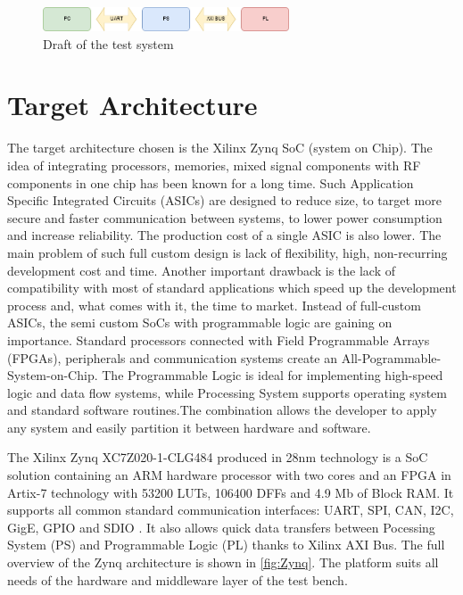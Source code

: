 \begin{figure}[H]
\centering
\includegraphics[width=0.65\textwidth]{figures/PCPSPL.png}
\caption{Draft of the test system}
\label{fig:draft}
\end{figure}

\section {Target Architecture}
The target architecture chosen is the Xilinx Zynq SoC (system on Chip). The idea of integrating processors, memories, mixed signal components with RF components in one chip has been known for a long time. Such Application Specific Integrated Circuits (ASICs) are designed to reduce size, to target more secure and faster communication between systems, to lower power consumption and increase reliability. The production cost of a single ASIC is also lower. The main problem of such full custom design is lack of flexibility, high, non-recurring development cost and time. Another important drawback is the lack of compatibility with most of standard applications which speed up the development process and, what comes with it, the time to market. Instead of full-custom ASICs, the semi custom SoCs with programmable logic are gaining on importance. Standard processors connected with Field Programmable Arrays (FPGAs), peripherals and communication systems create an All-Pogrammable-System-on-Chip. The Programmable Logic is ideal for implementing high-speed logic and data flow systems, while Processing System supports operating system and standard software routines.The combination allows the developer to apply any system and easily partition it between hardware and software.

The Xilinx Zynq XC7Z020-1-CLG484 produced in 28nm technology is a SoC solution containing an ARM hardware processor with two cores and an FPGA in Artix-7 technology with 53200 LUTs, 106400 DFFs and 4.9 Mb of Block RAM. It supports all common standard communication interfaces: UART, SPI, CAN, I2C, GigE, GPIO and SDIO . It also allows quick data transfers between Pocessing System (PS) and Programmable Logic (PL) thanks to Xilinx AXI Bus. The full overview of the Zynq architecture is shown in \autoref{fig:Zynq}. The platform suits all needs of the hardware and middleware layer of the test bench.

